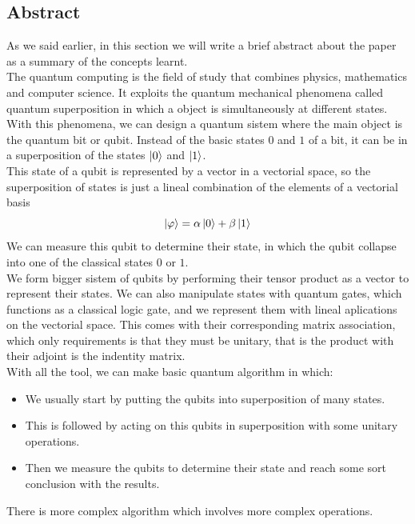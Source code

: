 \documentclass[a4paper]{article}
\numberwithin{equation}{section}
\begin{document}
\subsection{Abstract}
As we said earlier, in this section we will write a brief abstract about the paper as a summary of the concepts learnt.\\
\linebreak
The quantum computing is the field of study that combines physics, mathematics and computer science. It exploits the quantum mechanical phenomena called quantum superposition in which a object is simultaneously at different states. With this phenomena, we can design a quantum sistem where the main object is the quantum bit or qubit. Instead of the basic states $0$ and $1$ of a bit, it can be in a superposition of the states $\ket{0}$ and $\ket{1}$.\\
\linebreak
This state of a qubit is represented by a vector in a vectorial space, so the superposition of states is just a lineal combination of the elements of a vectorial basis
\begin{equation}
\ket{\varphi} = \alpha \ket{0} + \beta \ket{1}
\end{equation}
We can measure this qubit to determine their state, in which the qubit collapse into one of the classical states $0$ or $1$.\\
\linebreak
We form bigger sistem of qubits by performing their tensor product as a vector to represent their states. We can also manipulate states with quantum gates, which functions as a classical logic gate, and we represent them with lineal aplications on the vectorial space. This comes with their corresponding matrix association, which only requirements is that they must be unitary, that is the product with their adjoint is the indentity matrix.\\
\linebreak
With all the tool, we can make basic quantum algorithm in which:
\begin{itemize}
\item We usually start by putting the qubits into superposition of many states.

\item This is followed by acting on this qubits in superposition with some unitary operations.

\item Then we measure the qubits to determine their state and reach some sort conclusion with the results.
\end{itemize}
There is more complex algorithm which involves more complex operations.


\nocite{*}




\end{document}

